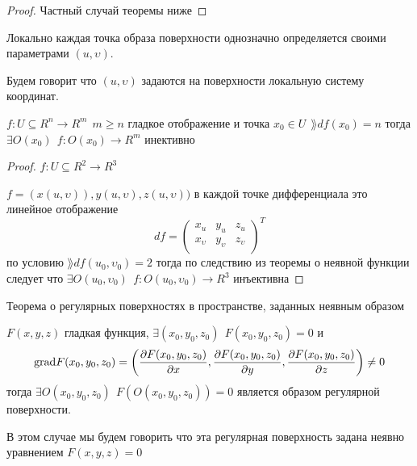 \begin{proof}
  Частный случай теоремы ниже
\end{proof}

\begin{block}[Следствие]
  Локально каждая точка образа поверхности однозначно определяется своими
  параметрами $(u, \upsilon)$.

  Будем говорит что $(u, \upsilon)$ задаются на поверхности локальную систему
  координат.
\end{block}

\begin{theorem}
  $f: U \subseteq R^n \to R^m ~~ m \ge n$ гладкое отображение и точка
  $x_0 \in U ~~ \rang df(x_0) = n$ тогда $\exists O(x_0) ~~
  f: O(x_0) \to R^m$ инективно
\end{theorem}

\begin{proof}
  $f: U \subseteq R^2 \to R^3$

  $f = (x(u, \upsilon)), y(u, \upsilon), z(u, \upsilon))$ в каждой точке
  дифференциала это линейное отображение
  $$
  df =
  \left(
  \begin{array}{ccc}
    x_u & y_u & z_u \\
    x_{\upsilon} & y_{\upsilon} & z_{\upsilon} \\
  \end{array}
  \right)^T
  $$
  по условию $\rang df(u_0, \upsilon_0) = 2$ тогда по следствию из теоремы о
  неявной функции следует что $\exists O(u_0, \upsilon_0) ~~
  f: O(u_0, \upsilon_0) \to R^3$ инъективна
\end{proof}

\begin{title}[\Large]
  Теорема о регулярных поверхностях в пространстве, заданных неявным образом
\end{title}

\begin{theorem}
  $F(x,y,z)$ гладкая функция, $\exists (x_0, y_0, z_0) ~~ F(x_0, y_0, z_0) = 0$
  и
  $$
  \mathrm{grad} F(x_0, y_0, z_0) = \left(
  \frac{\partial F(x_0, y_0, z_0)}{\partial x},
  \frac{\partial F(x_0, y_0, z_0)}{\partial y},
  \frac{\partial F(x_0, y_0, z_0)}{\partial z}
  \right) \not= 0
  $$
  тогда $\exists O(x_0, y_0, z_0) ~~ F(O(x_0, y_0, z_0)) = 0$ является образом
  регулярной поверхности.

  В этом случае мы будем говорить что эта регулярная поверхность задана
  неявно уравнением $F(x, y, z) = 0$
\end{theorem}

